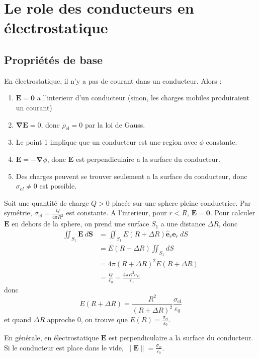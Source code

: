 \section{Le role des conducteurs en électrostatique}
\subsection{Propriétés de base}
En électrostatique, il n'y a pas de courant dans un conducteur. Alors :
\begin{enumerate}
\item $\boldsymbol{E}=\boldsymbol{0}$ a l'interieur d'un conducteur (sinon, les charges mobiles produiraient un courant)
\item $\boldsymbol{\nabla E}=0$, donc $\rho _{\mathrm{el}}=0$ par la loi de Gauss.
\item Le point 1 implique que un conducteur est une region avec $\phi$ constante. 
\item $\boldsymbol{E}=-\boldsymbol{\nabla}\phi$, donc $\boldsymbol{E}$ est perpendiculaire a la surface du conducteur.
\item Des charges peuvent se trouver seulement a la surface du conducteur, donc $\sigma _{el}\neq 0$ est possible.
\end{enumerate}
\begin{example}
Soit une quantité de charge $Q>0$ placée sur une sphere pleine conductrice. Par symétrie, $\sigma _{\mathrm{el}}=\frac{Q}{4\pi R^{2}}$ est constante. A l'interieur, pour $r<R$, $\boldsymbol{E}=\boldsymbol{0}$. Pour calculer $\boldsymbol{E}$ en dehors de la sphere, on prend une surface $S_{1}$ a une distance $\Delta R$, donc
\begin{align*}
\iint _{S_{1}}\boldsymbol{E}~d\boldsymbol{S} & =\iint _{S_{1}}E(R+\Delta R)\boldsymbol{\hat{e}}_{r}\boldsymbol{\hat{e}}_{r}~dS \\
 & =E(R+\Delta R)\iint _{S_{1}}dS \\
 & =4\pi(R+\Delta R)^{2}E(R+\Delta R) \\
 & =\frac{Q}{\varepsilon_{0}}=\frac{4\pi R^{2}\sigma _{\mathrm{el}}}{\varepsilon_{0} }
\end{align*}
donc 
$$
E(R+\Delta R)=\frac{R^{2}}{(R+\Delta R)^{2}}  \frac{\sigma _{\mathrm{el}}}{\varepsilon_{0}}
$$
et quand $\Delta R$ approche 0, on trouve que $E(R)=\frac{\sigma _{\mathrm{el}}}{\varepsilon_{0}}$. 
\end{example}
En générale, en électrostatique $\boldsymbol{E}$ est perpendiculaire a la surface du conducteur. Si le conducteur est place dans le vide, $\lVert \boldsymbol{E} \rVert=\frac{\sigma _{\mathrm{el}}}{\varepsilon_{0}}$.
